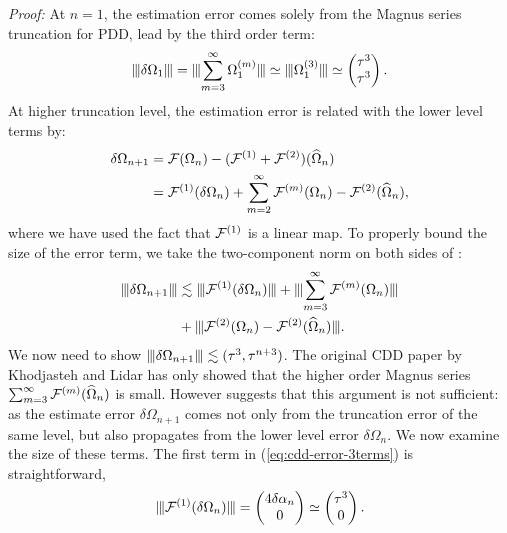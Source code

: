 \documentclass[pra,reprint,superscriptaddress]{revtex4-2}
\begin{document}
\emph{Proof:}
At $n=1$, the estimation error comes solely from the Magnus series truncation for PDD, lead by the third order term:
\begin{equation}
\opnorm{\delta\Omega_{1}} = \opnorm{\sum_{m=3}^\infty \Omega_{1}\up{m}}
\simeq \opnorm{\Omega_{1}\up{3}} \simeq
\begin{pmatrix}
\tau^3\\
\tau^3
\end{pmatrix}.
\end{equation}
At higher truncation level, the estimation error is related with the lower level terms by:
\begin{equation}\label{eq:error update}
 \begin{aligned}
\delta\Omega_{n+1} 
&=\mathcal{F}(\Omega_{n})-(\mathcal{F}^{(1)}+\mathcal{F}^{(2)})(\widehat{\Omega}_{n})\\
&= \mathcal{F}^{(1)}(\delta\Omega_{n})+ \sum_{m=2}^\infty \mathcal{F}^{(m)}(\Omega_{n})-\mathcal{F}^{(2)}(\widehat{\Omega}_{n}),
\end{aligned} 
\end{equation}
where we have used the fact that $\mathcal{F}^{(1)}$ is a linear map. 
To properly bound the size of the error term, we take the two-component norm on both sides of :
\begin{equation}
\begin{aligned}\label{eq:cdd-error-3terms}
\opnorm{\delta\Omega_{n+1} }
&\lesssim \opnorm{ \cF\up{1}(\delta\Omega_{n}) } + 
\opnorm{\sum_{m=3}^\infty \cF\up{m}( \Omega_{n})} \\
&+ \opnorm{ \cF\up{2}(\Omega_n)-\cF\up{2}(\Ohat_{n})}.
\end{aligned}    
\end{equation}
We now need to show $\opnorm{\delta\Omega_{n+1}}\lesssim(\tau^3,\tau^{n+3})$.
The original CDD paper by Khodjasteh and Lidar has only showed that the higher order Magnus series $\sum_{m=3}^\infty\mathcal{F}^{(m)}(\widehat{\Omega}_{n})$ is small.
However  suggests that this argument is not sufficient: as
the estimate error $\delta\Omega_{n+1}$ comes not only  from the truncation error of the same level, but also propagates from the lower level error $\delta\Omega_{n}$. 
We now examine the size of these terms.
The first term in (\ref{eq:cdd-error-3terms}) is straightforward,
\begin{equation*}
\opnorm{\cF\up{1}(\delta\Omega_{n})} = \begin{pmatrix}
4 \delta\alpha_{n} \\
0
\end{pmatrix}\simeq
\begin{pmatrix}
\tau^3 \\
0
\end{pmatrix}.
\end{equation*}
\end{document}
